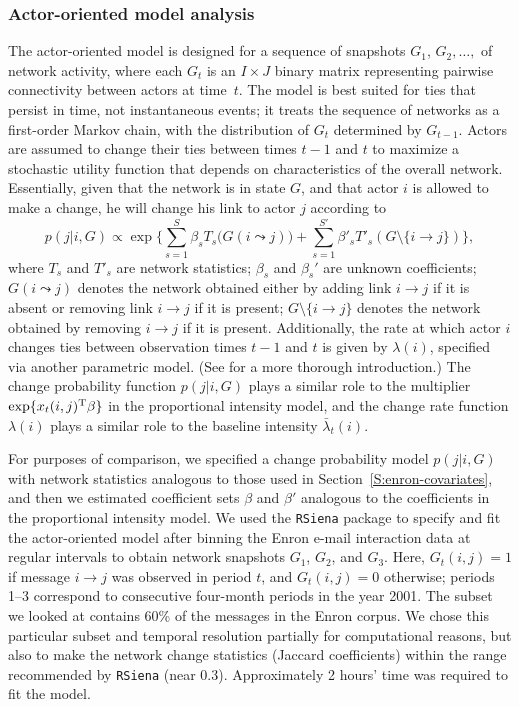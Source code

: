 \documentclass[final]{statsoc}
\begin{document}
\subsubsection{Actor-oriented model analysis}\label{sec:actor-oriented}

The actor-oriented model is designed for a sequence of snapshots $G_1$,
$G_2,\dotsc,$ of network activity, where each $G_t$ is an $I \times J$ binary
matrix representing pairwise connectivity between actors at time~$t$.  The
model is best suited for ties that persist in time, not instantaneous events;
it treats the sequence of networks as a first-order Markov chain, with the
distribution of $G_t$ determined by $G_{t-1}$.  Actors are assumed to change
their ties between times $t-1$ and $t$ to maximize a stochastic utility
function that depends on characteristics of the overall network.  Essentially,
given that the network is in state $G$, and that actor $i$ is allowed to make
a change, he will change his link to actor $j$ according to
\[
  p(j | i, G) \propto
    \exp\Big\{ \sum_{s=1}^S \beta_s T_s\big(G(i \leadsto j)\big)
      +
        \sum_{s=1}^{S'} \beta'_s T'_s(G \setminus \{ i \to j\})
    \Big\},
\]
where $T_s$ and $T'_s$ are network statistics; $\beta_s$ and $\beta_s'$ are
unknown coefficients; $G(i \leadsto j)$ denotes the network obtained either by
adding link $i \to j$ if it is absent or removing link $i \to j$ if it is
present; $G \setminus \{ i \to j \}$ denotes the network obtained by removing
$i \to j$ if it is present.  Additionally, the rate at which actor $i$ changes
ties between observation times $t-1$ and $t$ is given by $\lambda(i)$,
specified via another parametric model.  (See \citet{snijders2010introduction}
for a more thorough introduction.)  The change probability function $p(j | i,
G)$ plays a similar role to the multiplier $\exp\{ x_t(i,j)^{\mathrm{T}} \beta \}$
in the proportional intensity model, and the change rate function $\lambda(i)$
plays a similar role to the baseline intensity $\bar \lambda_t(i)$.

For purposes of comparison, we specified a change probability model $p(j | i,
G)$ with network statistics analogous to those used in
Section~\ref{S:enron-covariates}, and then we estimated coefficient sets
$\beta$ and $\beta'$ analogous to the coefficients in the proportional intensity
model.  We used the \texttt{RSiena} package \citep{rsiena2011} to specify and
fit the actor-oriented model after binning the Enron e-mail interaction data
at regular intervals to obtain network snapshots $G_1$, $G_2$, and $G_3$.
Here, $G_t(i,j) = 1$ if message $i \to j$ was observed in period $t$, and
$G_t(i,j) = 0$ otherwise; periods 1--3 correspond to consecutive four-month
periods in the year 2001.   The subset we looked at contains 60\% of the
messages in the Enron corpus.  We chose this particular subset and temporal
resolution partially for computational reasons, but also to make the network
change statistics (Jaccard coefficients) within the range recommended by
\texttt{RSiena} (near $0.3$).  Approximately 2 hours' time was required to fit
the model.
\end{document}
